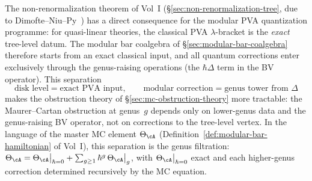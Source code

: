 \begin{remark}
\label{rem:pva-non-renormalization}
The non-renormalization theorem of Vol~I
(\S\ref{sec:non-renormalization-tree}, due to
Dimofte--Niu--Py~\cite{DNP2025}) has a direct consequence for the
modular PVA quantization programme: for quasi-linear theories, the
classical PVA $\lambda$-bracket is the \emph{exact} tree-level datum.
The modular bar coalgebra of
\S\ref{sec:modular-bar-coalgebra} therefore starts from an exact
classical input, and all quantum corrections enter exclusively
through the genus-raising operations (the $\hbar\Delta$ term in the
BV operator).  This separation
\[
  \text{disk level} = \text{exact PVA input},
  \qquad
  \text{modular correction} = \text{genus tower from $\Delta$}
\]
makes the obstruction theory of
\S\ref{sec:mc-obstruction-theory} more tractable:
the Maurer--Cartan obstruction at genus~$g$ depends only on
lower-genus data and the genus-raising BV operator, not on corrections
to the tree-level vertex.  In the language of the master MC element
$\Theta_{\cA}$ (Definition~\ref{def:modular-bar-hamiltonian} of
Vol~I), this separation is the genus filtration:
$\Theta_{\cA} = \Theta_{\cA}\big|_{\hbar=0} +
\sum_{g \geq 1} \hbar^g\,\Theta_{\cA}\big|_{g}$, with
$\Theta_{\cA}\big|_{\hbar=0}$ exact and each higher-genus correction
determined recursively by the MC equation.
\end{remark}

